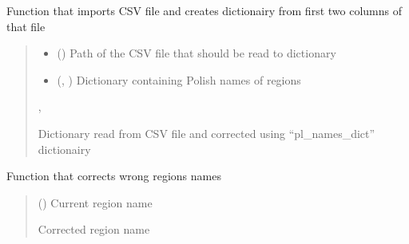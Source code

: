 \documentclass[letterpaper,10pt,english]{sphinxmanual}
\begin{document}
\begin{fulllineitems}
\label{\detokenize{pcm_utilities:pcm_utilities.csv_to_dict}}
\pysigstartsignatures
{}
\pysigstopsignatures
\sphinxAtStartPar
Function that imports CSV file and creates dictionairy from first two columns of that file
\begin{quote}\begin{description}
\begin{itemize}
\item {} 
\sphinxAtStartPar
{} () \textendash{} Path of the CSV file that should be read to dictionary

\item {} 
\sphinxAtStartPar
{} (\sphinxcode{\sphinxupquote{Dict}}{[}, \sphinxcode{\sphinxupquote{str}}{]}) \textendash{} Dictionary containing Polish names of regions

\end{itemize}

\sphinxAtStartPar
\sphinxcode{\sphinxupquote{Dict}}{[}, \sphinxcode{\sphinxupquote{str}}{]}

\sphinxAtStartPar
Dictionary read from CSV file and corrected using “pl\_names\_dict” dictionairy

\end{description}\end{quote}

\end{fulllineitems}


\begin{fulllineitems}
\label{\detokenize{pcm_utilities:pcm_utilities.get_corr_reg_name}}
\pysigstartsignatures
{}
\pysigstopsignatures
\sphinxAtStartPar
Function that corrects wrong regions names
\begin{quote}\begin{description}
\sphinxAtStartPar
{} () \textendash{} Current region name

\sphinxAtStartPar
{}

\sphinxAtStartPar
Corrected region name

\end{description}\end{quote}

\end{fulllineitems}
\end{document}

